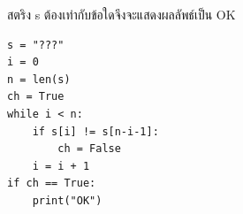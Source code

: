 \question สตริง s ต้องเท่ากับข้อใดจึงจะแสดงผลลัพธ์เป็น OK
\begin{verbatim}
s = "???"
i = 0
n = len(s)
ch = True
while i < n:
    if s[i] != s[n-i-1]:
        ch = False
    i = i + 1
if ch == True:
    print("OK")
\end{verbatim}
